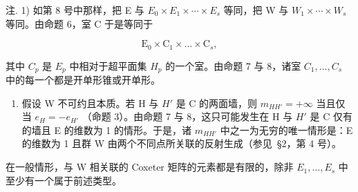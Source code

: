 注. 1) 如第 8 号中那样，把 E 与 \(E_{0} \times E_{1} \times \cdots \times E_{s}\) 等同，把 W 与 \(W_{1} \times \cdots \times W_{s}\) 等同。由命题 6，室 C 于是等同于

\[
\mathrm{E} _ {0} \times \mathrm{C} _ {1} \times \dots \times \mathrm{C} _ {s},
\]

其中 \(C_{p}\) 是 \(E_{p}\) 中相对于超平面集 \(H_{p}\) 的一个室。由命题 7 与 8，诸室 \(C_{1},\ldots,C_{s}\) 中的每一个都是开单形锥或开单形。

\begin{enumerate}
\def\labelenumi{\arabic{enumi})}
\setcounter{enumi}{1}
\tightlist
\item
  假设 W 不可约且本质。若 H 与 \(H'\) 是 C 的两面墙，则 \(m_{HH'} = +\infty\) 当且仅当 \(e_{H} = -e_{H'}\) （命题 3）。由命题 7 与 8，这只可能发生在 H 与 \(H'\) 是 C 仅有的墙且 E 的维数为 1 的情形。于是，诸 \(m_{HH'}\) 中之一为无穷的唯一情形是：E 的维数为 1 且群 W 由两个不同点所关联的反射生成（参见~§2，第 4 号）。
\end{enumerate}

在一般情形，与 W 相关联的 Coxeter 矩阵的元素都是有限的，除非 \(E_{1},\ldots,E_{s}\) 中至少有一个属于前述类型。


